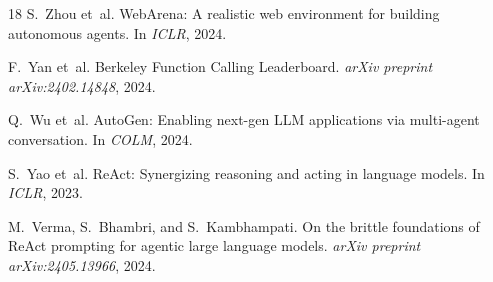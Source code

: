 \documentclass[sigconf]{acmart}
\begin{document}
\begin{thebibliography}{18}
S.~Zhou et~al.
\newblock WebArena: A realistic web environment for building autonomous agents.
\newblock In \emph{ICLR}, 2024.

F.~Yan et~al.
\newblock Berkeley Function Calling Leaderboard.
\newblock \emph{arXiv preprint arXiv:2402.14848}, 2024.

Q.~Wu et~al.
\newblock AutoGen: Enabling next-gen LLM applications via multi-agent conversation.
\newblock In \emph{COLM}, 2024.

S.~Yao et~al.
\newblock ReAct: Synergizing reasoning and acting in language models.
\newblock In \emph{ICLR}, 2023.

M.~Verma, S.~Bhambri, and S.~Kambhampati.
\newblock On the brittle foundations of ReAct prompting for agentic large language models.
\newblock \emph{arXiv preprint arXiv:2405.13966}, 2024.

\end{thebibliography}
\end{document}
